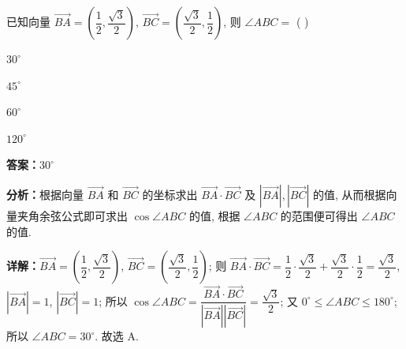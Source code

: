 \begin{question}[points=5]
已知向量 $\overrightarrow{BA}=(\dfrac{1}{2},\dfrac{\sqrt{3}}{2})$, $\overrightarrow{BC}=(\dfrac{\sqrt{3}}{2},\dfrac{1}{2})$, 则 $\angle ABC=$ ( )
\begin{choices}
  \item $30^{\circ}$
  \item $45^{\circ}$
  \item $60^{\circ}$
  \item $120^{\circ}$
\end{choices}
\begin{solution}
\textbf{答案：}$30^{\circ}$

\textbf{分析：}根据向量 $\overrightarrow{BA}$ 和 $\overrightarrow{BC}$ 的坐标求出 $\overrightarrow{BA}\cdot\overrightarrow{BC}$ 及 $|\overrightarrow{BA}|,|\overrightarrow{BC}|$ 的值, 从而根据向量夹角余弦公式即可求出 $\cos\angle ABC$ 的值, 根据 $\angle ABC$ 的范围便可得出 $\angle ABC$ 的值.

\textbf{详解：}$\overrightarrow{BA}=(\dfrac{1}{2},\dfrac{\sqrt{3}}{2})$, $\overrightarrow{BC}=(\dfrac{\sqrt{3}}{2},\dfrac{1}{2})$; 则 $\overrightarrow{BA}\cdot\overrightarrow{BC}=\dfrac{1}{2}\cdot\dfrac{\sqrt{3}}{2}+\dfrac{\sqrt{3}}{2}\cdot\dfrac{1}{2}=\dfrac{\sqrt{3}}{2}$, $|\overrightarrow{BA}|=1$, $|\overrightarrow{BC}|=1$; 所以 $\cos\angle ABC=\dfrac{\overrightarrow{BA}\cdot\overrightarrow{BC}}{|\overrightarrow{BA}||\overrightarrow{BC}|}=\dfrac{\sqrt{3}}{2}$; 又 $0^{\circ}\le\angle ABC\le180^{\circ}$; 所以 $\angle ABC=30^{\circ}$. 故选 A.
\end{solution}
\end{question}

